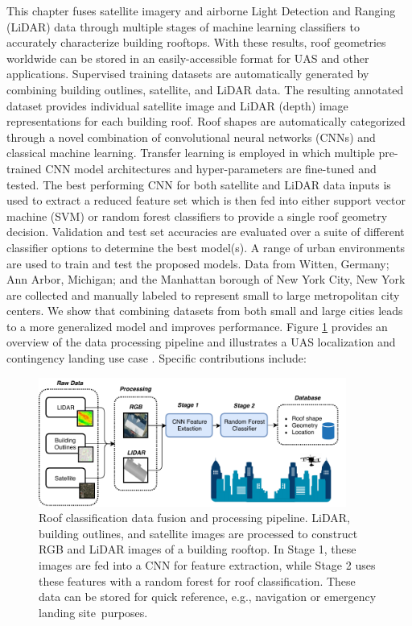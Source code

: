 This chapter fuses satellite imagery and airborne Light Detection and Ranging (LiDAR) data through multiple stages of machine learning classifiers to accurately characterize building rooftops.  With these results, roof geometries worldwide can be stored in an easily-accessible format for UAS and other applications. Supervised training datasets are automatically generated by combining building outlines, satellite, and LiDAR data. The resulting annotated dataset provides individual satellite image and LiDAR (depth) image representations for each building roof. Roof shapes are automatically categorized through a novel combination of convolutional neural networks (CNNs) and classical machine learning. Transfer learning is employed in which multiple pre-trained \ac{CNN} model architectures and hyper-parameters are fine-tuned and tested. The best performing \ac{CNN} for both satellite and LiDAR data inputs is used to extract a reduced feature set which is then fed into either support vector machine (SVM) or random forest classifiers to provide a single roof geometry decision.  Validation and test set accuracies are evaluated over a suite of different classifier options to determine the best model(s). A range of urban environments are used to train and test the proposed models. Data from Witten, Germany; Ann Arbor, Michigan; and the Manhattan borough of New York City, New York are collected and manually labeled to represent small to large metropolitan city centers. We show that combining datasets from both small and large cities leads to a more generalized model and improves performance. Figure \ref{fig:outline_methods} provides an overview of the data processing pipeline and illustrates a {UAS localization and contingency landing} use case \cite{castagno_comprehensive_2018}. Specific contributions include: 
\begin{figure}[t]
\centering
\includegraphics[width=0.90\textwidth]{chapter_4_roofshape/imgs/overview_process.pdf}
\caption[Roof classification data fusion and processing pipeline]{Roof classification data fusion and processing pipeline. LiDAR, building outlines, and satellite images are processed to construct RGB and LiDAR images of a building rooftop. In Stage    1, these images are fed into a \ac{CNN} for feature extraction, while Stage    2 uses these features with a random forest for roof classification. These data can be stored for quick reference, e.g., navigation or emergency landing site~purposes. }
\label{fig:outline_methods}
\end{figure}


